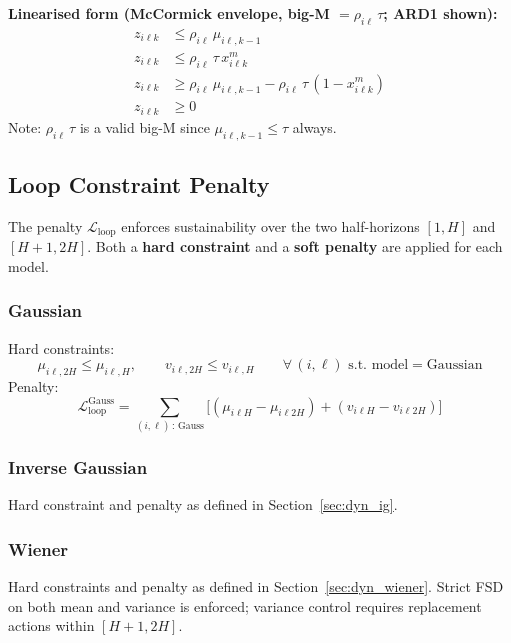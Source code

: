 \documentclass[11pt,a4paper]{article}
\begin{document}
\textbf{Linearised form (McCormick envelope, big-M $= \rho_{i\ell}\,\tau$; ARD1 shown):}
\begin{align}
  z_{i\ell k} &\leq \rho_{i\ell}\,\mu_{i\ell,k-1} \\
  z_{i\ell k} &\leq \rho_{i\ell}\,\tau\,x^m_{i\ell k} \\
  z_{i\ell k} &\geq \rho_{i\ell}\,\mu_{i\ell,k-1} - \rho_{i\ell}\,\tau\,(1-x^m_{i\ell k}) \\
  z_{i\ell k} &\geq 0
\end{align}
Note: $\rho_{i\ell}\,\tau$ is a valid big-M since $\mu_{i\ell,k-1} \leq \tau$ always.

\subsection{Loop Constraint Penalty}
\label{sec:loop}

The penalty $\mathcal{L}_{\mathrm{loop}}$ enforces sustainability over the two
half-horizons $[1,H]$ and $[H{+}1,2H]$.
Both a \textbf{hard constraint} and a \textbf{soft penalty} are applied for each model.

\subsubsection{Gaussian}
Hard constraints:
\begin{equation}
  \mu_{i\ell,2H} \leq \mu_{i\ell,H}, \qquad
  v_{i\ell,2H} \leq v_{i\ell,H} \qquad
  \forall\, (i,\ell)\text{ s.t. model} = \mathrm{Gaussian}
\end{equation}
Penalty:
\begin{equation}
  \mathcal{L}^{\mathrm{Gauss}}_{\mathrm{loop}} =
    \sum_{(i,\ell)\,:\,\mathrm{Gauss}}
    \bigl[(\mu_{i\ell H} - \mu_{i\ell 2H}) + (v_{i\ell H} - v_{i\ell 2H})\bigr]
\end{equation}

\subsubsection{Inverse Gaussian}
Hard constraint and penalty as defined in Section~\ref{sec:dyn_ig}.

\subsubsection{Wiener}
Hard constraints and penalty as defined in Section~\ref{sec:dyn_wiener}.
Strict FSD on both mean and variance is enforced; variance control requires
replacement actions within $[H+1,2H]$.
\end{document}

